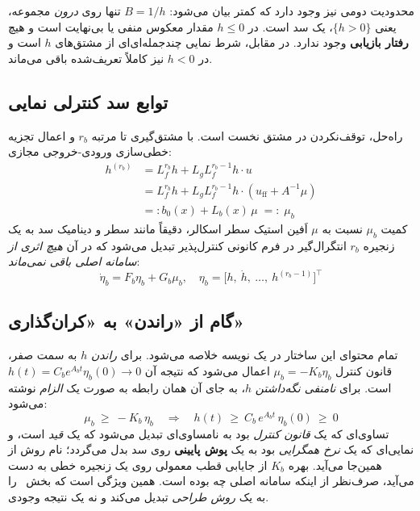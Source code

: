 \documentclass[10pt,twocolumn]{article}
\newcommand{\en}[1]{\lr{#1}}
\newcommand{\md}{\lr{\textemdash}}
\begin{document}
محدودیت دومی نیز وجود دارد که کمتر بیان می‌شود: $B=1/h$ تنها روی \emph{درون}
مجموعه، یعنی $\{h>0\}$، یک سد است. در $h\le 0$ مقدار معکوس منفی یا بی‌نهایت است
و هیچ \textbf{رفتار بازیابی} وجود ندارد. در مقابل، شرط نمایی چندجمله‌ای‌ای از
مشتق‌های $h$ است و در $h<0$ نیز کاملاً تعریف‌شده باقی می‌ماند.

\subsection{توابع سد کنترلی نمایی}
راه‌حل، توقف‌نکردن در مشتق نخست است. با مشتق‌گیری تا مرتبه $r_b$ و اعمال تجزیه
خطی‌سازی ورودی-خروجی مجازی:
\begin{align}
    h^{(r_b)} &= L_f^{r_b} h + L_g L_f^{r_b-1} h \cdot u \nonumber\\
              &= L_f^{r_b} h + L_g L_f^{r_b-1} h \cdot (u_{\mathrm{ff}} + A^{-1}\mu)
                 \nonumber\\
              &=: b_0(x) + L_b(x)\,\mu \;=:\; \mu_b
    \label{eq:viol}
\end{align}
کمیت $\mu_b$ نسبت به $\mu$ اَفین است\md{}یک سطر اسکالر، دقیقاً مانند سطر
\en{CLF}\md{}و دینامیک سد به یک زنجیره $r_b$ انتگرال‌گیر در فرم کانونی کنترل‌پذیر
تبدیل می‌شود که در آن \emph{هیچ اثری از سامانه اصلی باقی نمی‌ماند}:
\begin{equation}
    \dot{\eta}_b = F_b \eta_b + G_b \mu_b,\quad
    \eta_b = \big[h,\ \dot{h},\ \ldots,\ h^{(r_b-1)}\big]^{\top}
    \label{eq:chain}
\end{equation}

\subsection{گام از «راندن» به «کران‌گذاری»}
تمام محتوای این ساختار در یک نویسه خلاصه می‌شود. برای \emph{راندن} $h$ به سمت
صفر، قانون کنترل $\mu_b = -K_b\eta_b$ اعمال می‌شود که نتیجه آن
$h(t) = C_b e^{A_b t}\eta_b(0)\to 0$ است. برای \emph{نامنفی نگه‌داشتن} $h$، به
جای آن همان رابطه به صورت یک \emph{الزام} نوشته می‌شود:
\begin{equation}
    \mu_b \ \ge\ -K_b\,\eta_b
    \quad\Longrightarrow\quad
    h(t) \ \ge\ C_b\, e^{A_b t}\,\eta_b(0) \ \ge\ 0
    \label{eq:ecbf}
\end{equation}
تساوی‌ای که یک \emph{قانون کنترل} بود به نامساوی‌ای تبدیل می‌شود که یک
\emph{قید} است، و نمایی‌ای که یک \emph{نرخ همگرایی} بود به یک \textbf{پوش
پایینی} روی سد بدل می‌گردد؛ نام روش از همین‌جا می‌آید. بهره $K_b$ از جایابی قطب
معمولی روی یک زنجیره خطی به دست می‌آید، صرف‌نظر از اینکه سامانه اصلی چه بوده
است. همین ویژگی است که بخش~\en{5.2} را به یک \emph{روش طراحی} تبدیل می‌کند و نه یک
نتیجه وجودی.
\end{document}
